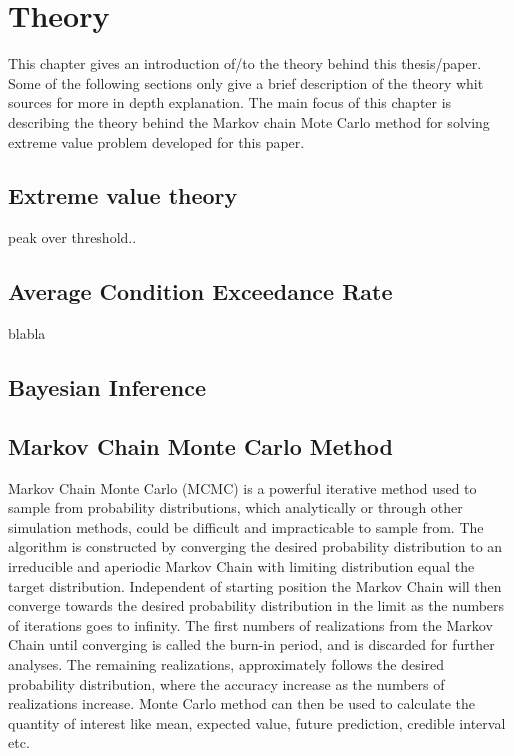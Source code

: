 \chapter[Theory]{Theory}
This chapter gives an introduction of/to the theory behind this thesis/paper. Some of the following sections only give a brief description of the theory whit sources for more in depth explanation. The main focus of this chapter is describing the theory behind the Markov chain Mote Carlo method for solving extreme value problem developed for this paper. 
\section{Extreme value theory}
peak over threshold..
\section{Average Condition Exceedance Rate}
blabla

\section{Bayesian Inference}
\label{ch:BayesianInference}

\section{Markov Chain Monte Carlo Method}
Markov Chain Monte Carlo (MCMC) is a powerful iterative method used to sample from probability distributions, which analytically or through other simulation methods, could be difficult and impracticable to sample from. The algorithm is constructed by converging the desired probability distribution to an irreducible and aperiodic Markov Chain with limiting distribution equal the target distribution. Independent of starting position the Markov Chain will then converge towards the desired probability distribution in the limit as the numbers of iterations goes to infinity. The first numbers of realizations from the Markov Chain until converging is called the burn-in period, and is discarded for further analyses. The remaining realizations, approximately follows the desired probability distribution, where the accuracy increase as the numbers of realizations increase. Monte Carlo method can then be used to calculate the quantity of interest like mean, expected value, future prediction, credible interval etc.

